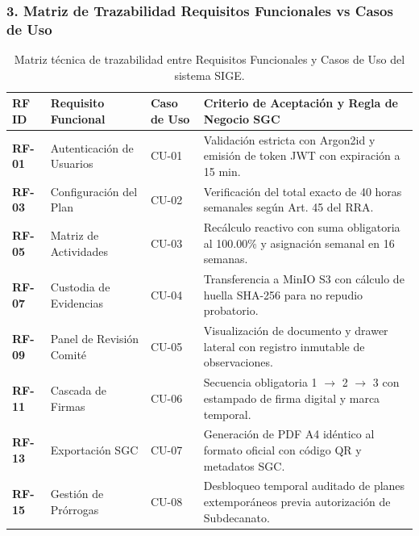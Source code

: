 \documentclass[12pt,a4paper]{article}
\begin{document}
\subsubsection*{3. Matriz de Trazabilidad Requisitos Funcionales vs Casos de Uso}
\begin{table}[H]
\centering
\small
\renewcommand{\arraystretch}{1.2}
\begin{tabularx}{\textwidth}{|>{\hsize=0.45\hsize\centering\arraybackslash\bfseries\footnotesize}X|>{\hsize=1.0\hsize\raggedright\arraybackslash\footnotesize}X|>{\hsize=0.55\hsize\centering\arraybackslash\footnotesize}X|>{\hsize=2.0\hsize\raggedright\arraybackslash\footnotesize}X|}
\hline
\rowcolor{tableheader}
\textbf{RF ID} & \textbf{Requisito Funcional} & \textbf{Caso de Uso} & \textbf{Criterio de Aceptación y Regla de Negocio SGC} \\
\hline
RF-01 & Autenticación de Usuarios & CU-01 & Validación estricta con Argon2id y emisión de token JWT con expiración a 15 min. \\
\hline
RF-03 & Configuración del Plan & CU-02 & Verificación del total exacto de 40 horas semanales según Art. 45 del RRA. \\
\hline
RF-05 & Matriz de Actividades & CU-03 & Recálculo reactivo con suma obligatoria al 100.00\% y asignación semanal en 16 semanas. \\
\hline
RF-07 & Custodia de Evidencias & CU-04 & Transferencia a MinIO S3 con cálculo de huella SHA-256 para no repudio probatorio. \\
\hline
RF-09 & Panel de Revisión Comité & CU-05 & Visualización de documento y drawer lateral con registro inmutable de observaciones. \\
\hline
RF-11 & Cascada de Firmas & CU-06 & Secuencia obligatoria 1 $\to$ 2 $\to$ 3 con estampado de firma digital y marca temporal. \\
\hline
RF-13 & Exportación SGC & CU-07 & Generación de PDF A4 idéntico al formato oficial con código QR y metadatos SGC. \\
\hline
RF-15 & Gestión de Prórrogas & CU-08 & Desbloqueo temporal auditado de planes extemporáneos previa autorización de Subdecanato. \\
\hline
\end{tabularx}
\caption{Matriz técnica de trazabilidad entre Requisitos Funcionales y Casos de Uso del sistema SIGE.}
\end{table}
\end{document}

